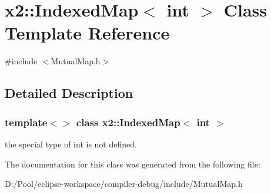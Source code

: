 \hypertarget{classx2_1_1_indexed_map_3_01int_01_4}{}\section{x2\+:\+:Indexed\+Map$<$ int $>$ Class Template Reference}
\label{classx2_1_1_indexed_map_3_01int_01_4}


{\ttfamily \#include $<$Mutual\+Map.\+h$>$}



\subsection{Detailed Description}
\subsubsection*{template$<$$>$\newline
class x2\+::\+Indexed\+Map$<$ int $>$}

the special type of int is not defined. 

The documentation for this class was generated from the following file\+:\begin{DoxyCompactItemize}
\item 
D\+:/\+Pool/eclipse-\/workspace/compiler-\/debug/include/Mutual\+Map.\+h\end{DoxyCompactItemize}
